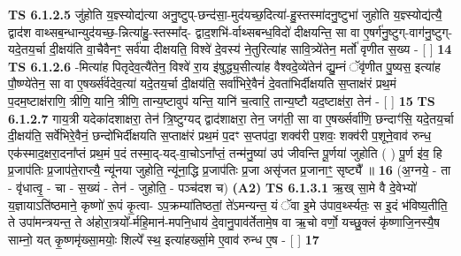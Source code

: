 \documentclass[17pt]{extarticle}
\begin{document}
                  \newline
                                \textbf{ TS 6.1.2.5} \newline
                  जु॑होति य॒ज्ञ्स्योद्य॑त्या अनु॒ष्टुप्-छन्द॑सा॒-मुद॑यच्छ॒दित्या॑-हु॒स्तस्मा॑दनु॒ष्टुभा॑ जुहोति य॒ज्ञ्स्योद्य॑त्यै॒ द्वाद॑श वाथ्सब॒न्धान्युद॑यच्छ॒-न्नित्या॑हु॒-स्तस्मा᳚द्- द्वाद॒शभि॑-र्वाथ्सबन्ध॒विदो॑ दीक्षयन्ति॒ सा वा ए॒षर्ग॑नु॒ष्टुग्-वाग॑नु॒ष्टुग्-यदे॒तय॒र्चा दी॒क्षय॑ति वा॒चैवैनꣳ॒॒ सर्व॑या दीक्षयति॒ विश्वे॑ दे॒वस्य॑ ने॒तुरित्या॑ह सावि॒त्र्ये॑तेन॒ मर्तो॑ वृणीत स॒ख्य - [  ] \textbf{  14} \newline
                  \newline
                                \textbf{ TS 6.1.2.6} \newline
                  -मित्या॑ह पितृदेव॒त्यै॑तेन॒ विश्वे॑ रा॒य इ॑षुद्ध्य॒सीत्या॑ह वैश्वदे॒व्ये॑तेन॑ द्यु॒म्नं ॅवृ॑णीत पु॒ष्यस॒ इत्या॑ह पौ॒ष्ण्ये॑तेन॒ सा वा ए॒षर्ख्स॑र्वदेव॒त्या॑ यदे॒तय॒र्चा दी॒क्षय॑ति॒ सर्वा॑भिरे॒वैनं॑ दे॒वता॑भिर्दीक्षयति स॒प्ताक्ष॑रं प्रथ॒मं प॒दम॒ष्टाक्ष॑राणि॒ त्रीणि॒ यानि॒ त्रीणि॒ तान्य॒ष्टावुप॑ यन्ति॒ यानि॑ च॒त्वारि॒ तान्य॒ष्टौ यद॒ष्टाक्ष॑रा॒ तेन॑ - [  ] \textbf{  15} \newline
                  \newline
                                \textbf{ TS 6.1.2.7} \newline
                  गाय॒त्री यदेका॑दशाक्षरा॒ तेन॑ त्रि॒ष्टुग्यद् द्वाद॑शाक्षरा॒ तेन॒ जग॑ती॒ सा वा ए॒षर्ख्सर्वा॑णि॒ छन्दाꣳ॑सि॒ यदे॒तय॒र्चा दी॒क्षय॑ति॒ सर्वे॑भिरे॒वैनं॒ छन्दो॑भिर्दीक्षयति स॒प्ताक्ष॑रं प्रथ॒मं प॒दꣳ स॒प्तप॑दा॒ शक्व॑री प॒शवः॒ शक्व॑री प॒शूने॒वाव॑ रुन्ध॒ एक॑स्माद॒क्षरा॒दना᳚प्तं प्रथ॒मं प॒दं तस्मा॒द्-यद्-वा॒चोऽना᳚प्तं॒ तन्म॑नु॒ष्या॑ उप॑ जीवन्ति पू॒र्णया॑ जुहोति ( ) पू॒र्ण इ॑व॒ हि प्र॒जाप॑तिः प्र॒जाप॑ते॒राप्त्यै॒ न्यू॑नया जुहोति॒ न्यू॑ना॒द्धि प्र॒जाप॑तिः प्र॒जा असृ॑जत प्र॒जानाꣳ॒॒ सृष्ट्यै᳚ ॥ \textbf{  16} \newline
                  \newline
                      (अ॒ग्नये॒ - ता - वृ॑धात्वृ॒ - चा - स॒ख्यं - तेन॑ - जुहोति॒ - पञ्च॑दश च)  \textbf{(A2)} \newline \newline
                                        \textbf{ TS 6.1.3.1} \newline
                  ऋ॒ख् सा॒मे वै दे॒वेभ्यो॑ य॒ज्ञायाऽति॑ष्ठमाने॒ कृष्णो॑ रू॒पं कृ॒त्वा- ऽप॒क्रम्या॑तिष्ठतां॒ ते॑ऽमन्यन्त॒ यं ॅवा इ॒मे उ॑पाव॒र्थ्स्यतः॒ स इ॒दं भ॑विष्य॒तीति॒ ते उपा॑मन्त्रयन्त॒ ते अ॑होरा॒त्रयो᳚-र्महि॒मान॑-मपनि॒धाय॑ दे॒वानु॒पाव॑र्तेतामे॒ष वा ऋ॒चो वर्णो॒ यच्छु॒क्लं कृ॑ष्णाजि॒नस्यै॒ष साम्नो॒ यत् कृ॒ष्णमृ॑ख्सा॒मयोः॒ शिल्पे᳚ स्थ॒ इत्या॑हर्ख्सा॒मे ए॒वाव॑ रुन्ध ए॒ष - [  ] \textbf{  17} \newline
\end{document}
